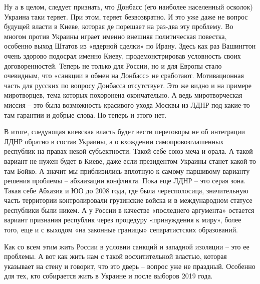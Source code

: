 Ну а в целом, следует признать, что Донбасс (его наиболее населенный осколок)
Украина таки теряет. При этом, теряет безвозвратно. И это уже даже не вопрос
будущей власти в Киеве, которая де порешает на раз-два эту проблему. Во многом
против Украины играет именно внешняя политическая повестка, особенно выход
Штатов из «ядерной сделки» по Ирану. Здесь как раз Вашингтон очень здорово
подосрал именно Киеву, продемонстрировав условность своих договоренностей.
Теперь не только для России, но и для Европы стало очевидным, что «санкции в
обмен на Донбасс» не сработают. Мотивационная часть для русских по вопросу
Донбасса отсутствует. Это же видно и на примере миротворцев, тема которых
похоронена окончательно. А ведь миротворческая миссия – это была возможность
красивого ухода Москвы из ЛДНР под какие-то там гарантии и добрые слова. Но
теперь и этого нет.

В итоге, следующая киевская власть будет вести переговоры не об интеграции ЛДНР
обратно в состав Украины, а о вхождении самопровозглашенных республик на правах
некой субъектности. Такой себе союз меча и орала. А такой вариант не нужен
будет в Киеве, даже если президентом Украины станет какой-то там Бойко. А
значит мы приблизились вплотную к самому паршивому варианту решения проблемы –
абхаизации конфликта. Пока еще ЛДНР – это серая зона. Такая себе Абхазия и ЮО
до 2008 года, где была чересполосица, значительную часть территории
контролировали грузинские войска и в международном статусе республики были
никем. А у России в качестве «последнего аргумента» остается вариант признания
республик через процедуру «принуждения к миру», более того, еще и с выходом «на
законные границы» сепаратистских образований.

Как со всем этим жить России в условии санкций и западной изоляции – это ее
проблемы. А вот как жить нам с такой восхитительной властью, которая указывает
на стену и говорит, что это дверь – вопрос уже не праздный. Особенно для тех,
кто собирается жить в Украине и после выборов 2019 года.

